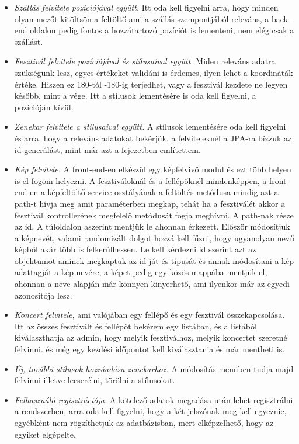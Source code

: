 \begin{itemize}
\item \textit{Szállás felvitele pozíciójával együtt.} Itt oda kell figyelni arra, hogy minden olyan mezőt kitöltsön a feltöltő ami a szállás szempontjából releváns, a back-end oldalon pedig fontos a hozzátartozó pozíciót is lementeni, nem elég csak a szállást.

\item \textit{Fesztivál felvitele pozíciójával és stílusaival együtt.} Miden releváns adatra szükségünk lesz, egyes értékeket validáni is érdemes, ilyen lehet a koordináták értéke. Hiszen ez 180-tól -180-ig terjedhet, vagy a fesztivál kezdete ne legyen később, mint a vége. Itt a stílusok lementésére is oda kell figyelni, a pozícióján kívül.

\item \textit{Zenekar felvitele a stílusaival együtt.} A stílusok lementésére oda kell figyelni és arra, hogy a releváns adatokat bekérjük, a felviteleknél a JPA-ra bízzuk az id generálást, mint már azt a fejezetben említettem.

\item \textit{Kép felvitele.} A front-end-en elkészül egy képfelvivő modul és ezt több helyen is el fogom helyezni. A fesztiváloknál és a fellépőknél mindenképpen, a front-end-en a képfeltöltő service osztályának a feltöltés metódusa mindig azt a path-t hívja meg amit paraméterben megkap, tehát ha a fesztiválét akkor a fesztivál kontrollerének megfelelő metódusát fogja meghívni. A path-nak része az id. A túloldalon aszerint mentjük le ahonnan érkezett. Először módosítjuk a képnevét, valami randomizált dolgot hozzá kell fűzni, hogy ugyanolyan nevű képből akár több is felkerülhessen. Le kell kérdezni id szerint azt az objektumot aminek megkaptuk az id-ját és típusát és annak módosítani a kép adattagját a kép nevére, a képet pedig egy közös mappába mentjük el, ahonnan a neve alapján már könnyen kinyerhető, ami ilyenkor már az egyedi azonosítója lesz.

\item \textit{Koncert felvitele}, ami valójában egy fellépő és egy fesztivál összekapcsolása. Itt az összes fesztivált és fellépőt bekérem egy listában, és a listából kiválaszthatja az admin, hogy melyik fesztiválhoz, melyik koncertet szeretné felvinni. és még egy kezdési időpontot kell kiválasztania és már mentheti is.

\item \textit{Új, további stílusok hozzáadása zenekarhoz.} A módosítás menüben tudja majd felvinni illetve lecserélni, törölni a stílusokat.

\item \textit{Felhasználó regisztrációja.} A kötelező adatok megadása után lehet regisztrálni a rendszerben, arra oda kell figyelni, hogy a két jelszónak meg kell egyeznie, egyébként nem rögzíthetjük az adatbázisban, mert elképzelhető, hogy az egyiket elgépelte.
\end{itemize}

